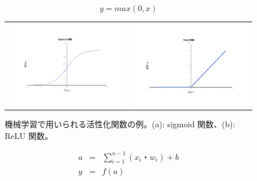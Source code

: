 \begin{equation}
    y = max(0,x)
    \label{equ:ReLU}
\end{equation}

\begin{figure}
    \begin{tabular}{cc}
    \begin{minipage}[b]{0.45\hsize}
        \includegraphics[clip, width=7cm]{fig/4/sigmoid_2.pdf}
        \subcaption{}
        \label{fig:sigmoid}
    \end{minipage}&
    \begin{minipage}[b]{0.45\hsize}
        \includegraphics[clip, width=7cm]{fig/4/ReLU_2.pdf}
        \subcaption{}
        \label{fig:ReLU}
    \end{minipage}
    \end{tabular}
    \caption{機械学習で用いられる活性化関数の例。(a): sigmoid 関数、(b): ReLU 関数。}
    \label{fig:acctivation}
\end{figure}
\begin{eqnarray}
    a &=& \sum^{n-1}_{i=1}(x_i・w_i) + b \label{equ:input}\\
    y &=& f(a)\label{equ:activation}
\end{eqnarray}

